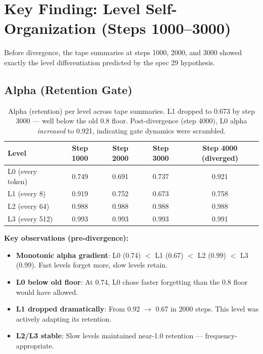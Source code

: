 \documentclass[11pt,a4paper]{article}
\begin{document}
\section{Key Finding: Level Self-Organization (Steps 1000--3000)}

Before divergence, the tape summaries at steps 1000, 2000, and 3000 showed exactly the level differentiation predicted by the spec 29 hypothesis.

\subsection{Alpha (Retention Gate)}

\begin{table}[h]
\centering
\begin{tabular}{lcccc}
\toprule
\textbf{Level} & \textbf{Step 1000} & \textbf{Step 2000} & \textbf{Step 3000} & \textbf{Step 4000 (diverged)} \\
\midrule
L0 (every token) & 0.749 & 0.691 & 0.737 & 0.921 \\
L1 (every 8) & 0.919 & 0.752 & \textcolor{failred}{0.673} & 0.758 \\
L2 (every 64) & 0.988 & 0.988 & 0.988 & 0.988 \\
L3 (every 512) & 0.993 & 0.993 & 0.993 & 0.991 \\
\bottomrule
\end{tabular}
\caption{Alpha (retention) per level across tape summaries. L1 dropped to 0.673 by step 3000 --- well below the old 0.8 floor. Post-divergence (step 4000), L0 alpha \emph{increased} to 0.921, indicating gate dynamics were scrambled.}
\end{table}

\textbf{Key observations (pre-divergence):}
\begin{itemize}
\item \textbf{Monotonic alpha gradient}: L0 (0.74) $<$ L1 (0.67) $<$ L2 (0.99) $<$ L3 (0.99). Fast levels forget more, slow levels retain.
\item \textbf{L0 below old floor}: At 0.74, L0 chose faster forgetting than the 0.8 floor would have allowed.
\item \textbf{L1 dropped dramatically}: From 0.92 $\to$ 0.67 in 2000 steps. This level was actively adapting its retention.
\item \textbf{L2/L3 stable}: Slow levels maintained near-1.0 retention --- frequency-appropriate.
\end{itemize}
\end{document}
